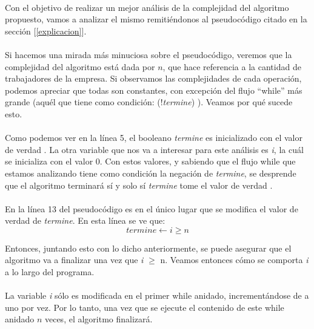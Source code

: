 \paragraph{}
Con el objetivo de realizar un mejor análisis de la complejidad del algoritmo propuesto, vamos a analizar el mismo remitiéndonos al pseudocódigo citado en la sección [\ref{explicacion}].

\paragraph{}
Si hacemos una mirada más minuciosa sobre el pseudocódigo, veremos que la complejidad del algoritmo está dada por $n$, que hace referencia a la cantidad de trabajadores de la empresa. Si observamos las complejidades de cada operación, podemos apreciar que todas son constantes, con excepción del flujo ``while'' más grande (aquél que tiene como condición: (!\textit{termine}) ). Veamos por qué sucede esto.

\paragraph{}
Como podemos ver en la línea 5, el booleano \textit{termine} es inicializado con el valor de verdad \false. La otra variable que nos va a interesar para este análisis es \textit{i}, la cuál se inicializa con el valor 0. Con estos valores, y sabiendo que el flujo while que estamos analizando tiene como condición la negación de \textit{termine}, se desprende que el algoritmo terminará sí y solo sí \textit{termine} tome el valor de verdad \true .

\paragraph{}
En la línea 13 del pseudocódigo es en el único lugar que se modifica el valor de verdad de \textit{termine}. En esta línea se ve que:
\begin{equation}
termine \leftarrow i \geq n
\end{equation}

Entonces, juntando esto con lo dicho anteriormente, se puede asegurar que el algoritmo va a finalizar una vez que \textit{i} \ensuremath{\geq} n. Veamos entonces cómo se comporta \textit{i} a lo largo del programa.

\paragraph{}
La variable \textit{i} sólo es modificada en el primer while anidado, incrementándose de a uno por vez. Por lo tanto, una vez que se ejecute el contenido de este while anidado $n$ veces, el algoritmo finalizará.

